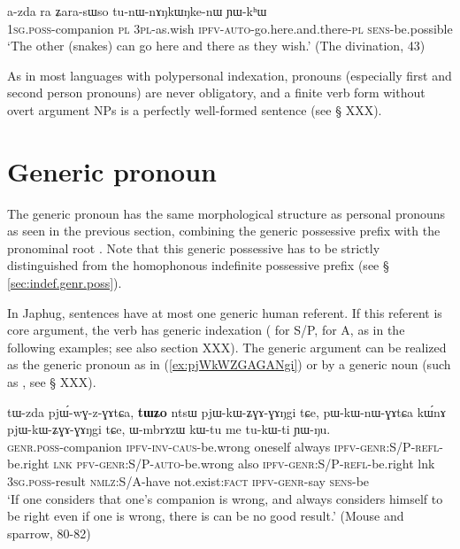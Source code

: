 \begin{exe}
\ex \label{ex:ʑara.sWso}
\gll a-zda ra ʑara-sɯso tu-nɯ-nɤŋkɯŋke-nɯ ɲɯ-kʰɯ \\
\textsc{1sg.poss}-companion \textsc{pl} \textsc{3pl}-as.wish \textsc{ipfv}-\textsc{auto}-go.here.and.there-\textsc{pl} \textsc{sens}-be.possible \\
\glt `The other (snakes) can go here and there as they wish.' (The divination, 43)
\end{exe}

As in most languages with polypersonal indexation, pronouns (especially first and second person pronouns) are never obligatory, and a finite verb form without overt argument NPs is a perfectly well-formed sentence (see § XXX). 

\section{Generic pronoun}  \label{sec:genr.pro}
The generic pronoun  has the same morphological structure as personal pronouns as seen in the previous section, combining the generic possessive prefix  with the pronominal root . Note that this generic possessive has to be strictly distinguished from the homophonous indefinite possessive prefix  (see § \ref{sec:indef.genr.poss}).

In Japhug, sentences have at most one generic human referent. If this referent is core argument, the verb has generic indexation ( for S/P,  for A, as in the following examples; see also section XXX). The generic argument can be realized as the generic pronoun  as in (\ref{ex:pjWkWZGAGANgi}) or by a generic noun (such as , see § XXX).

\begin{exe}
\ex \label{ex:pjWkWZGAGANgi}
\gll tɯ-zda pjɯ́-wɣ-z-ɣɤtɕa, \textbf{tɯʑo}  ntsɯ  pjɯ-kɯ-ʑɣɤ-ɣɤŋgi   	tɕe,  pɯ-kɯ-nɯ-ɣɤtɕa 	kɯ́nɤ   	pjɯ-kɯ-ʑɣɤ-ɣɤŋgi   	tɕe,    ɯ-mbrɤzɯ   	kɯ-tu   	me  	tu-kɯ-ti   	ɲɯ-ŋu.   \\
\textsc{genr.poss}-companion \textsc{ipfv-inv-caus}-be.wrong oneself always \textsc{ipfv-genr:S/P-refl}-be.right \textsc{lnk} \textsc{pfv-genr:S/P-auto}-be.wrong also \textsc{ipfv-genr:S/P-refl}-be.right lnk \textsc{3sg.poss}-result \textsc{nmlz:S/A}-have  not.exist:\textsc{fact} \textsc{ipfv-genr}-say \textsc{sens}-be \\
\glt  `If one considers that one's companion is wrong, and always considers himself to be right even if one is wrong, there is can be no good result.' (Mouse and sparrow, 80-82)
\end{exe} 

